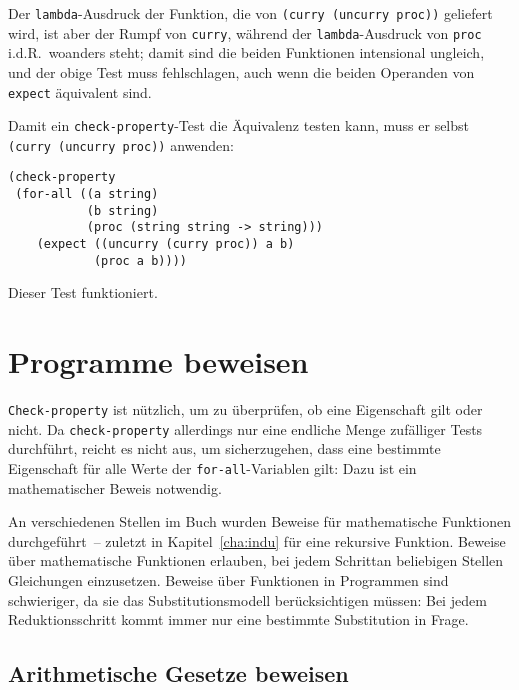 Der \lstinline{lambda}-Ausdruck der Funktion, die von
\lstinline{(curry (uncurry proc))} geliefert wird, ist aber der Rumpf von
\lstinline{curry}, während der \lstinline{lambda}-Ausdruck von \lstinline{proc}
i.d.R.\ woanders steht; damit sind die beiden Funktionen intensional
ungleich, und der obige Test muss fehlschlagen, auch wenn die beiden
Operanden von \lstinline{expect} äquivalent sind.

Damit ein \lstinline{check-property}-Test die Äquivalenz testen kann, muss
er selbst \lstinline{(curry (uncurry proc))} anwenden:
%
\begin{lstlisting}
(check-property
 (for-all ((a string)
           (b string)
           (proc (string string -> string)))
    (expect ((uncurry (curry proc)) a b)
            (proc a b))))
\end{lstlisting}
%
Dieser Test funktioniert.

\section{Programme beweisen}
\label{sec:programme-beweisen}

\lstinline{Check-property} ist nützlich, um zu überprüfen, ob eine
Eigenschaft gilt oder nicht.  Da \lstinline{check-property} allerdings
nur eine endliche Menge zufälliger Tests durchführt, reicht es nicht
aus, um sicherzugehen, dass eine bestimmte Eigenschaft für alle Werte
der \lstinline{for-all}-Variablen gilt: Dazu ist ein mathematischer
Beweis notwendig.

An verschiedenen Stellen im Buch wurden Beweise für mathematische
Funktionen durchgeführt~-- zuletzt in Kapitel~\ref{cha:indu} für
eine rekursive Funktion.  Beweise über mathematische Funktionen
erlauben, bei jedem Schrittan beliebigen Stellen Gleichungen
einzusetzen.  Beweise über Funktionen in Programmen sind schwieriger,
da sie das Substitutionsmodell berücksichtigen müssen: Bei jedem
Reduktionsschritt kommt immer nur eine bestimmte Substitution in
Frage.

\subsection{Arithmetische Gesetze beweisen}
\label{sec:scheme-arithmetik-beweis}

